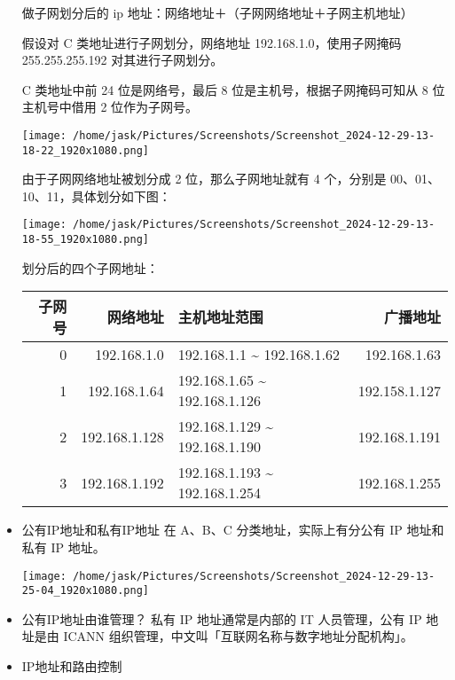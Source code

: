 \documentclass[11pt]{article}
\begin{document}
\begin{itemize}
做子网划分后的 ip 地址：网络地址＋（子网网络地址＋子网主机地址）

假设对 C 类地址进行子网划分，网络地址 192.168.1.0，使用子网掩码 255.255.255.192 对其进行子网划分。

C 类地址中前 24 位是网络号，最后 8 位是主机号，根据子网掩码可知从 8 位主机号中借用 2 位作为子网号。

\begin{center}
\texttt{[image: /home/jask/Pictures/Screenshots/Screenshot\_2024-12-29-13-18-22\_1920x1080.png]}
\end{center}
由于子网网络地址被划分成 2 位，那么子网地址就有 4 个，分别是 00、01、10、11，具体划分如下图：

\begin{center}
\texttt{[image: /home/jask/Pictures/Screenshots/Screenshot\_2024-12-29-13-18-55\_1920x1080.png]}
\end{center}

划分后的四个子网地址：
\begin{center}
\begin{tabular}{rrlr}
子网号 & 网络地址 & 主机地址范围 & 广播地址\\
\hline
0 & 192.168.1.0 & 192.168.1.1 \textasciitilde{} 192.168.1.62 & 192.168.1.63\\
1 & 192.168.1.64 & 192.168.1.65 \textasciitilde{} 192.168.1.126 & 192.158.1.127\\
2 & 192.168.1.128 & 192.168.1.129 \textasciitilde{} 192.168.1.190 & 192.168.1.191\\
3 & 192.168.1.192 & 192.168.1.193 \textasciitilde{} 192.168.1.254 & 192.168.1.255\\
\end{tabular}
\end{center}

\item 公有IP地址和私有IP地址
在 A、B、C 分类地址，实际上有分公有 IP 地址和私有 IP 地址。

\begin{center}
\texttt{[image: /home/jask/Pictures/Screenshots/Screenshot\_2024-12-29-13-25-04\_1920x1080.png]}
\end{center}

\item 公有IP地址由谁管理？
私有 IP 地址通常是内部的 IT 人员管理，公有 IP 地址是由 ICANN 组织管理，中文叫「互联网名称与数字地址分配机构」。

\item IP地址和路由控制


\end{itemize}
\end{document}
